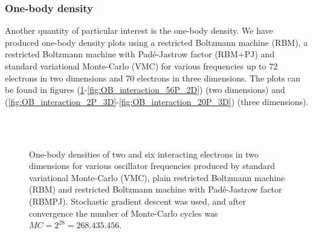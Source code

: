 \subsubsection{One-body density}
Another quantity of particular interest is the one-body density. We have produced one-body density plots using a restricted Boltzmann machine (RBM), a restricted Boltzmann machine with Padé-Jastrow factor (RBM+PJ) and standard variational Monte-Carlo (VMC) for various frequencies up to 72 electrons in two dimensions and 70 electrons in three dimensions. The plots can be found in figures (\ref{fig:OB_interaction_2P_2D}-\ref{fig:OB_interaction_56P_2D}) (two dimensions) and (\ref{fig:OB_interaction_2P_3D}-\ref{fig:OB_interaction_20P_3D}) (three dimensions).


\begin{figure} [H]
	\centering
	\\
	
	\\
	
	
	\caption{One-body densities of two and six interacting electrons in two dimensions for various oscillator frequencies produced by standard variational Monte-Carlo (VMC), plain restricted Boltzmann machine (RBM) and restricted Boltzmann machine with Padé-Jastrow factor (RBMPJ). Stochastic gradient descent was used, and after convergence the number of Monte-Carlo cycles was $MC=2^{28}=268.435.456$.}%
	\label{fig:OB_interaction_2P_2D}
\end{figure}
